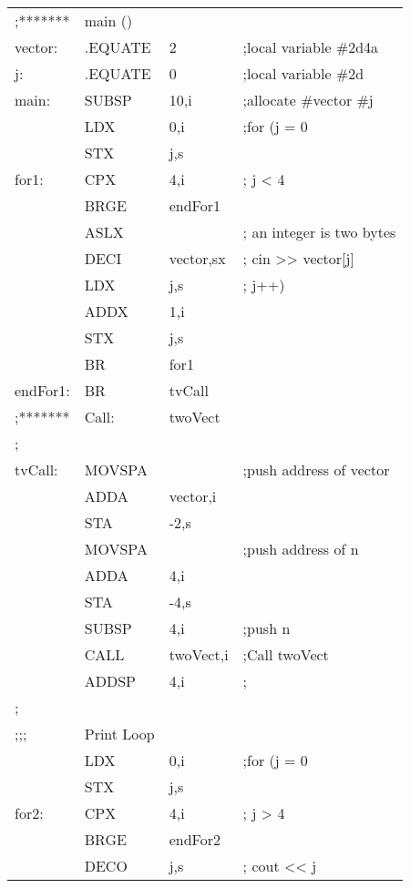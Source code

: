 \documentclass[a4paper,man,natbib]{apa6}
\begin{document}
\begin{tabular}{l l l l}
;*******& main ()& & \\
vector:	&.EQUATE &2       & ;local variable \#2d4a \\
j:      &.EQUATE &0       & ;local variable \#2d \\
main:   &SUBSP   &10,i    &  ;allocate \#vector \#j \\
        &LDX     &0,i     &  ;for (j = 0 \\
        &STX     &j,s     &   \\
for1:   &CPX     &4,i     &  ;   j < 4 \\
        &BRGE    &endFor1    &\\ 
        &ASLX    &           & ;   an integer is two bytes  \\
        &DECI    &vector,sx  & ;   cin >> vector[j] \\
        &LDX     &j,s        & ;   j++) \\
        &ADDX    &1,i        & \\ 
        &STX     &j,s        & \\
        &BR      &for1       & \\
endFor1:&BR      &tvCall     & \\
;*******&Call: &twoVect  &\\
;&&&\\
tvCall: &MOVSPA &           & ;push address of vector \\
        &ADDA   &vector,i &\\
        &STA    &-2,s &\\
        &MOVSPA &          & ;push address of n \\
        &ADDA   &4,i &\\
        &STA    &-4,s &\\
        &SUBSP  &4,i       & ;push n \\
        &CALL   &twoVect,i & ;Call twoVect \\
        &ADDSP  &4,i       & ; \\
; &&&\\
;;;&Print Loop &&\\
        &LDX    &0,i       & ;for (j = 0 \\
        &STX    &j,s  & \\
for2:   &CPX    &4,i      &  ;   j > 4 \\
        &BRGE   &endFor2   & \\  
        &DECO   &j,s       & ;   cout << j \\

\end{tabular}
\end{document}
